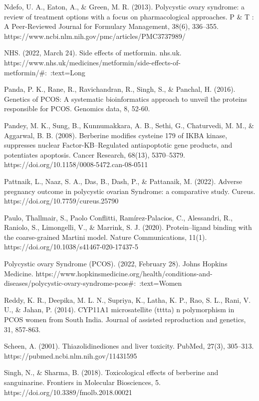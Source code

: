Ndefo, U. A., Eaton, A., & Green, M. R. (2013). Polycystic ovary syndrome: a review of treatment options with a focus on pharmacological approaches. P & T : A Peer-Reviewed Journal for Formulary Management, 38(6), 336–355. https://www.ncbi.nlm.nih.gov/pmc/articles/PMC3737989/

NHS. (2022, March 24). Side effects of metformin. nhs.uk. https://www.nhs.uk/medicines/metformin/side-effects-of-metformin/#:~:text=Long%

Panda, P. K., Rane, R., Ravichandran, R., Singh, S., & Panchal, H. (2016). Genetics of PCOS: A systematic bioinformatics approach to unveil the proteins responsible for PCOS. Genomics data, 8, 52-60.

Pandey, M. K., Sung, B., Kunnumakkara, A. B., Sethi, G., Chaturvedi, M. M., & Aggarwal, B. B. (2008). Berberine modifies cysteine 179 of IΚBΑ kinase, suppresses nuclear Factor-ΚB–Regulated antiapoptotic gene products, and potentiates apoptosis. Cancer Research, 68(13), 5370–5379. https://doi.org/10.1158/0008-5472.can-08-0511

Pattnaik, L., Naaz, S. A., Das, B., Dash, P., & Pattanaik, M. (2022). Adverse pregnancy outcome in polycystic ovarian Syndrome: a comparative study. Cureus. https://doi.org/10.7759/cureus.25790

Paulo, Thallmair, S., Paolo Conflitti, Ramírez-Palacios, C., Alessandri, R., Raniolo, S., Limongelli, V., & Marrink, S. J. (2020). Protein–ligand binding with the coarse-grained Martini model. Nature Communications, 11(1). https://doi.org/10.1038/s41467-020-17437-5

Polycystic ovary Syndrome (PCOS). (2022, February 28). Johns Hopkins Medicine. https://www.hopkinsmedicine.org/health/conditions-and-diseases/polycystic-ovary-syndrome-pcos#:~:text=Women%

Reddy, K. R., Deepika, M. L. N., Supriya, K., Latha, K. P., Rao, S. L., Rani, V. U., & Jahan, P. (2014). CYP11A1 microsatellite (tttta) n polymorphism in PCOS women from South India. Journal of assisted reproduction and genetics, 31, 857-863.

Scheen, A. (2001). Thiazolidinediones and liver toxicity. PubMed, 27(3), 305–313. https://pubmed.ncbi.nlm.nih.gov/11431595

Singh, N., & Sharma, B. (2018). Toxicological effects of berberine and sanguinarine. Frontiers in Molecular Biosciences, 5. https://doi.org/10.3389/fmolb.2018.00021

